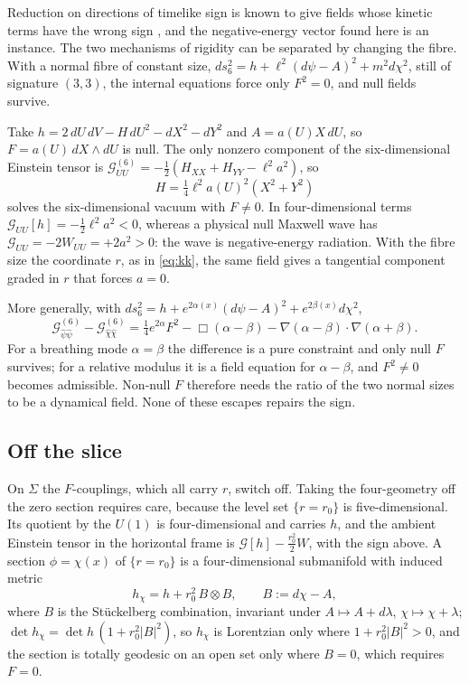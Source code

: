 Reduction on directions of timelike sign is known to give fields whose kinetic terms have the wrong sign \cite{Hull98}, and the negative-energy vector
found here is an instance. The two mechanisms of rigidity can be separated by changing the fibre. With a normal fibre of constant size,
$ds_6^2=h+\ell^2(d\psi-A)^2+m^2d\chi^2$, still of signature $(3,3)$, the internal equations force only $F^2=0$, and null fields survive.

\begin{example}
\label{ex:nullwave}
Take $h=2\,dU\,dV-H\,dU^2-dX^2-dY^2$ and $A=a(U)X\,dU$, so $F=a(U)\,dX\wedge dU$ is null. The only nonzero component of the six-dimensional Einstein tensor is
$\mathcal G^{(6)}_{UU}=-\tfrac12(H_{XX}+H_{YY}-\ell^2a^2)$, so
\[
H=\tfrac14\ell^2a(U)^2(X^2+Y^2)
\]
solves the six-dimensional vacuum with $F\neq0$. In four-dimensional terms $\mathcal G_{UU}[h]=-\tfrac12\ell^2a^2<0$, whereas a physical null Maxwell wave has
$\mathcal G_{UU}=-2W_{UU}=+2a^2>0$: the wave is negative-energy radiation. With the fibre size the coordinate $r$, as in \eqref{eq:kk}, the same field gives a
tangential component graded in $r$ that forces $a=0$.
\end{example}

More generally, with $ds_6^2=h+e^{2\alpha(x)}(d\psi-A)^2+e^{2\beta(x)}d\chi^2$,
\[
\mathcal G^{(6)}_{\hat\psi\hat\psi}-\mathcal G^{(6)}_{\hat\chi\hat\chi}=\tfrac14e^{2\alpha}F^2-\Box(\alpha-\beta)-\nabla(\alpha-\beta)\cdot\nabla(\alpha+\beta).
\]
For a breathing mode $\alpha=\beta$ the difference is a pure constraint and only null $F$ survives; for a relative modulus it is a field equation for $\alpha-\beta$,
and $F^2\neq0$ becomes admissible. Non-null $F$ therefore needs the ratio of the two normal sizes to be a dynamical field. None of these escapes repairs
the sign.

\subsection{Off the slice}

On $\Sigma$ the $F$-couplings, which all carry $r$, switch off. Taking the four-geometry off the zero section requires care, because the level set
$\{r=r_0\}$ is five-dimensional. Its quotient by the $U(1)$ is four-dimensional and carries $h$, and the ambient Einstein tensor in the horizontal frame is
$\mathcal G[h]-\tfrac{r_0^2}2W$, with the sign above. A section $\phi=\chi(x)$ of $\{r=r_0\}$ is a four-dimensional submanifold with induced metric
\[
h_\chi=h+r_0^2\,B\otimes B,\qquad B:=d\chi-A ,
\]
where $B$ is the St\"uckelberg combination, invariant under $A\mapsto A+d\lambda$, $\chi\mapsto\chi+\lambda$; $\det h_\chi=\det h\,(1+r_0^2|B|^2)$, so $h_\chi$ is Lorentzian
only where $1+r_0^2|B|^2>0$, and the section is totally geodesic on an open set only where $B=0$, which requires $F=0$.

